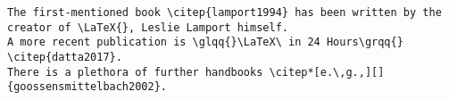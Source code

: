 \inputminted[breaklines]{bibtex}{exercises/literature/literature.done.bib}

\begin{verbatim}
The first-mentioned book \citep{lamport1994} has been written by the creator of \LaTeX{}, Leslie Lamport himself.
A more recent publication is \glqq{}\LaTeX\ in 24 Hours\grqq{} \citep{datta2017}.
There is a plethora of further handbooks \citep*[e.\,g.,][]{goossensmittelbach2002}.



\end{verbatim}
